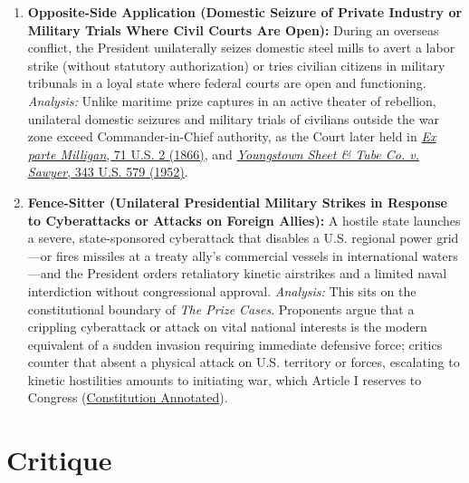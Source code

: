 \documentclass[12pt]{article}
\begin{document}
\begin{enumerate}
\item \textbf{Opposite-Side Application (Domestic Seizure of Private Industry or Military Trials Where Civil Courts Are Open):} During an overseas conflict, the President unilaterally seizes domestic steel mills to avert a labor strike (without statutory authorization) or tries civilian citizens in military tribunals in a loyal state where federal courts are open and functioning. \textit{Analysis:} Unlike maritime prize captures in an active theater of rebellion, unilateral domestic seizures and military trials of civilians outside the war zone exceed Commander-in-Chief authority, as the Court later held in \href{https://sites.gsu.edu/us-constipedia/ex-parte-milligan-1866/}{\textit{Ex parte Milligan}, 71 U.S. 2 (1866)}, and \href{https://supreme.justia.com/cases/federal/us/343/579/}{\textit{Youngstown Sheet \& Tube Co. v. Sawyer}, 343 U.S. 579 (1952)}.

\item \textbf{Fence-Sitter (Unilateral Presidential Military Strikes in Response to Cyberattacks or Attacks on Foreign Allies):} A hostile state launches a severe, state-sponsored cyberattack that disables a U.S. regional power grid---or fires missiles at a treaty ally's commercial vessels in international waters---and the President orders retaliatory kinetic airstrikes and a limited naval interdiction without congressional approval. \textit{Analysis:} This sits on the constitutional boundary of \textit{The Prize Cases}. Proponents argue that a crippling cyberattack or attack on vital national interests is the modern equivalent of a sudden invasion requiring immediate defensive force; critics counter that absent a physical attack on U.S. territory or forces, escalating to kinetic hostilities amounts to initiating war, which Article I reserves to Congress (\href{https://www.law.cornell.edu/constitution-conan/article-1/section-8/clause-1/civil-war-war-powers-and-the-prize-cases}{Constitution Annotated}).
\end{enumerate}

\section{Critique}
\end{document}
